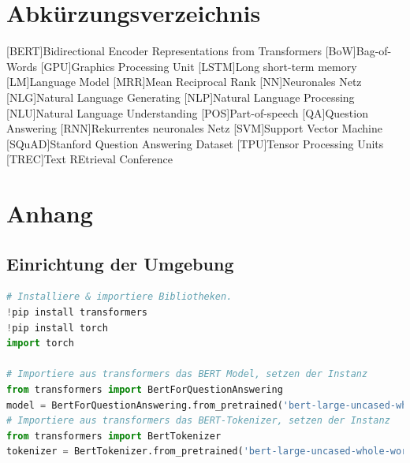 \documentclass[
        ngerman,
        paper=a4,
        numbers=noendperiod,
]{scrreprt}
\begin{document}
\chapter*{Abkürzungsverzeichnis}
\begin{acronym}
[BERT]{Bidirectional Encoder Representations from Transformers}
[BoW]{Bag-of-Words}
[GPU]{Graphics Processing Unit}
[LSTM]{Long short-term memory}
[LM]{Language Model}
[MRR]{Mean Reciprocal Rank}
[NN]{Neuronales Netz}
[NLG]{Natural Language Generating}
[NLP]{Natural Language Processing}
[NLU]{Natural Language Understanding}
[POS]{Part-of-speech}
[QA]{Question Answering}
[RNN]{Rekurrentes neuronales Netz}
[SVM]{Support Vector Machine}
[SQuAD]{Stanford Question Answering Dataset}
[TPU]{Tensor Processing Units}
[TREC]{Text REtrieval Conference}




\end{acronym}
\clearpage 
{} 
\listofmyequations
\clearpage
{} 
\lstlistoflistings
\clearpage
\setcounter{page}{1}
























\appendix 
\chapter{Anhang}
\label{chapter:Anhang}%


\section{Einrichtung der Umgebung}
\label{section:EINR} %
\begin{lstlisting}[language=Python]
# Installiere & importiere Bibliotheken.
!pip install transformers
!pip install torch
import torch

# Importiere aus transformers das BERT Model, setzen der Instanz
from transformers import BertForQuestionAnswering
model = BertForQuestionAnswering.from_pretrained('bert-large-uncased-whole-word-masking-finetuned-squad')
# Importiere aus transformers das BERT-Tokenizer, setzen der Instanz
from transformers import BertTokenizer
tokenizer = BertTokenizer.from_pretrained('bert-large-uncased-whole-word-masking-finetuned-squad')
\end{lstlisting}
\end{document}
